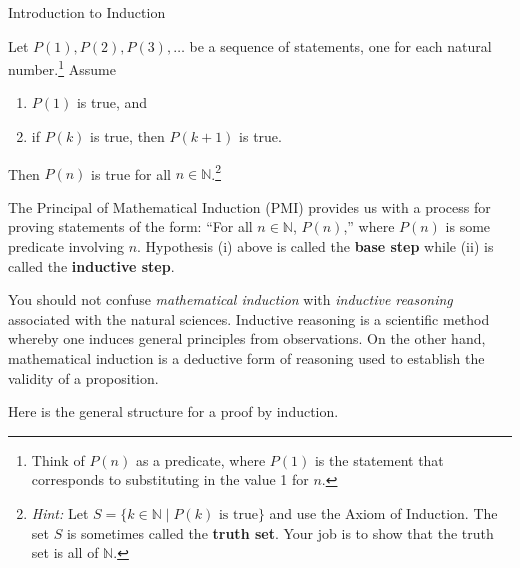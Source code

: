 \begin{section}{Introduction to Induction}
\begin{theorem}\label{thm:PMI}
Let $P(1), P(2), P(3), \ldots$ be a sequence of statements, one for each natural number.\footnote{Think of $P(n)$ as a predicate, where $P(1)$ is the statement that corresponds to substituting in the value 1 for $n$.} Assume
\begin{enumerate}[label=\textrm{(\roman*)}]
\item $P(1)$ is true, and
\item if $P(k)$ is true, then $P(k+1)$ is true.
\end{enumerate}
Then $P(n)$ is true for all $n\in\mathbb{N}$.\footnote{\emph{Hint:} Let $S=\{k\in \mathbb{N}\mid P(k) \text{ is true}\}$ and use the Axiom of Induction.  The set $S$ is sometimes called the \textbf{truth set}.  Your job is to show that the truth set is all of $\mathbb{N}$.}
\end{theorem}

The Principal of Mathematical Induction (PMI) provides us with a process for proving statements of the form: ``For all $n\in\mathbb{N}$, $P(n)$,'' where $P(n)$ is some predicate involving $n$.  Hypothesis (i) above is called the \textbf{base step} while (ii) is called the \textbf{inductive step}.

You should not confuse \emph{mathematical induction} with \emph{inductive reasoning} associated with the natural sciences. Inductive reasoning is a scientific method whereby one induces general principles from observations. On the other hand, mathematical induction is a deductive form of reasoning used to establish the validity of a proposition.

\begin{skeleton}
Here is the general structure for a proof by induction.

\begin{center}
\end{center}
\end{skeleton}


\end{section}
